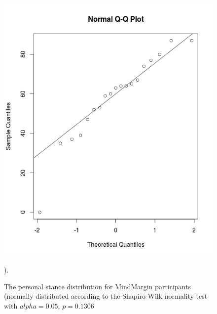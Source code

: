 \begin{figure}
\centering
\includegraphics[scale=0.25]{mm_normal.png}
\caption{The personal stance distribution for MindMargin participants (normally distributed according to the Shapiro-Wilk normality test with $alpha=0.05$, $p=0.1306$}).
\label{fig:mm_normal}
\end{figure}

